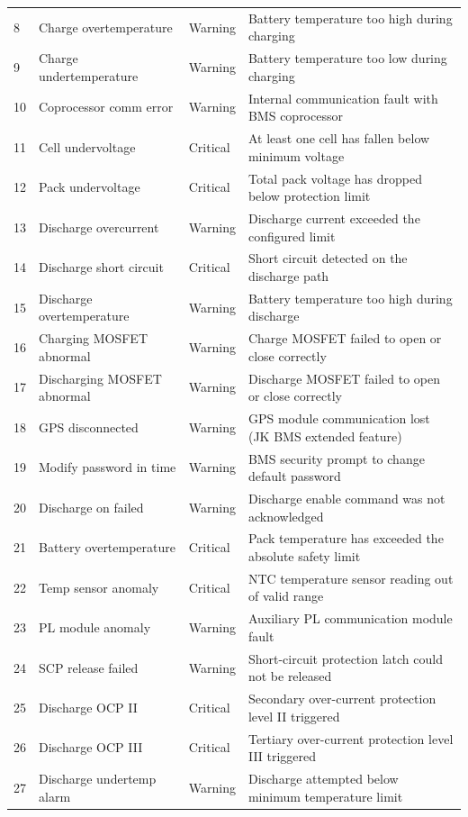 \documentclass[12pt, a4paper]{report}
\begin{document}
{\begin{longtable}{C{1.2cm} L{5.0cm} C{2.0cm} L{4.5cm}}
8  & Charge overtemperature   & Warning  & Battery temperature too high during charging \\
9  & Charge undertemperature  & Warning  & Battery temperature too low during charging \\
10 & Coprocessor comm error   & Warning  & Internal communication fault with BMS coprocessor \\
11 & Cell undervoltage        & Critical & At least one cell has fallen below minimum voltage \\
12 & Pack undervoltage        & Critical & Total pack voltage has dropped below protection limit \\
13 & Discharge overcurrent    & Warning  & Discharge current exceeded the configured limit \\
14 & Discharge short circuit  & Critical & Short circuit detected on the discharge path \\
15 & Discharge overtemperature& Warning  & Battery temperature too high during discharge \\
16 & Charging MOSFET abnormal & Warning  & Charge MOSFET failed to open or close correctly \\
17 & Discharging MOSFET abnormal & Warning & Discharge MOSFET failed to open or close correctly \\
18 & GPS disconnected         & Warning  & GPS module communication lost (JK BMS extended feature) \\
19 & Modify password in time  & Warning  & BMS security prompt to change default password \\
20 & Discharge on failed      & Warning  & Discharge enable command was not acknowledged \\
21 & Battery overtemperature  & Critical & Pack temperature has exceeded the absolute safety limit \\
22 & Temp sensor anomaly      & Critical & NTC temperature sensor reading out of valid range \\
23 & PL module anomaly        & Warning  & Auxiliary PL communication module fault \\
24 & SCP release failed       & Warning  & Short-circuit protection latch could not be released \\
25 & Discharge OCP II         & Critical & Secondary over-current protection level II triggered \\
26 & Discharge OCP III        & Critical & Tertiary over-current protection level III triggered \\
27 & Discharge undertemp alarm& Warning  & Discharge attempted below minimum temperature limit \\

\end{longtable}}
\end{document}
